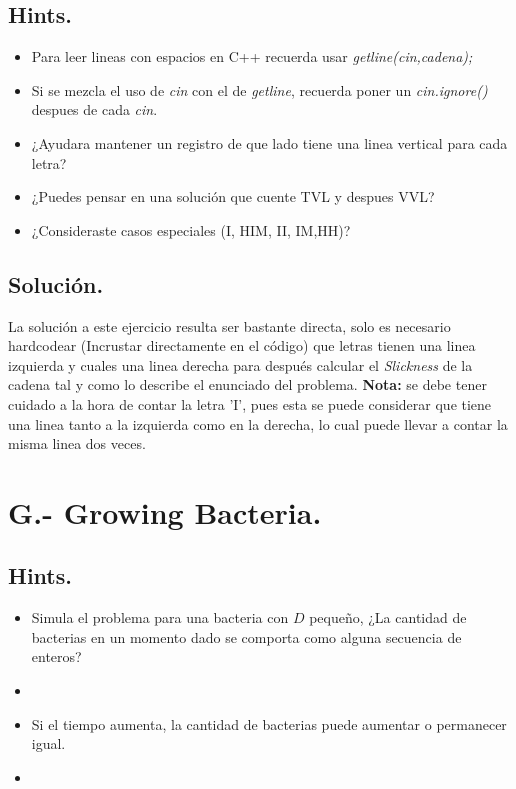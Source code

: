 \documentclass[12pt,letterpaper,titlepage]{article}
\begin{document}
\subsection{Hints.}
\begin{itemize}
	\item Para leer lineas con espacios en C++ recuerda usar \textit{getline(cin,cadena);}
	\item Si se mezcla el uso de \textit{cin} con el de \textit{getline}, recuerda poner un \textit{cin.ignore()} despues de cada \textit{cin}.
	\item ¿Ayudara mantener un registro de que lado tiene una linea vertical para cada letra?
	\item ¿Puedes pensar en una solución que cuente TVL y despues VVL?
	\item ¿Consideraste casos especiales (I, HIM, II, IM,HH)?
\end{itemize}
\subsection{Solución.}
La solución a este ejercicio resulta ser bastante directa, solo es necesario hardcodear (Incrustar directamente en el código) que letras tienen una linea izquierda y cuales una linea derecha para después calcular el \textit{Slickness} de la cadena tal y como lo describe el enunciado del problema. \textbf{Nota:} se debe tener cuidado a la hora de contar la letra 'I', pues esta se puede considerar que tiene una linea tanto a la izquierda como en la derecha, lo cual puede llevar a contar la misma linea dos veces.

\clearpage\section{G.- Growing Bacteria.}
\subsection{Hints.}
\begin{itemize}
	\item Simula el problema para una bacteria con $D$ pequeño, ¿La cantidad de bacterias en un momento dado se comporta como alguna secuencia de enteros?
	\item {}
	\item Si el tiempo aumenta, la cantidad de bacterias puede aumentar o permanecer igual.
	\item {}
\end{itemize}
\end{document}
